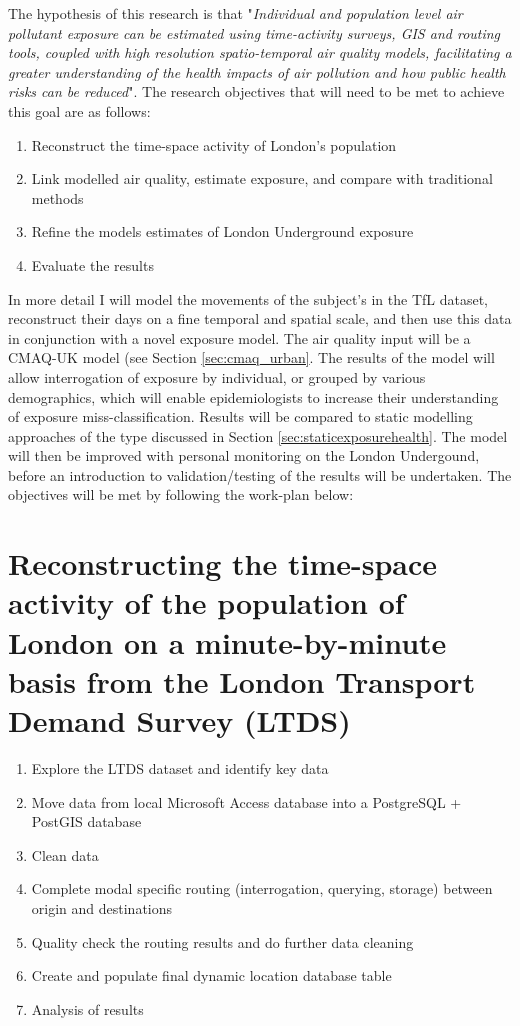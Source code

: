 The hypothesis of this research is that "\textit{Individual and population level air pollutant exposure can be estimated using time-activity surveys, GIS and routing tools, coupled with high resolution spatio-temporal air quality models, facilitating a greater understanding of the health impacts of air pollution and how public health risks can be reduced}". The research objectives that will need to be met to achieve this goal are as follows:

\begin{enumerate}
\item Reconstruct the time-space activity of London's population
\item Link modelled air quality, estimate exposure, and compare with traditional methods
\item Refine the models estimates of London Underground exposure
\item Evaluate the results
\end{enumerate}

In more detail I will model the movements of the subject's in the TfL dataset, reconstruct their days on a fine temporal and spatial scale, and then use this data in conjunction with a novel exposure model. The air quality input will be a CMAQ-UK model (see Section \ref{sec:cmaq_urban}. The results of the model will allow interrogation of exposure by individual, or grouped by various demographics, which will enable epidemiologists to increase their understanding of exposure miss-classification. Results will be compared to static modelling approaches of the type discussed in Section \ref{sec:staticexposurehealth}. The model will then be improved with personal monitoring on the London Undergound, before an introduction to validation/testing of the results will be undertaken. The objectives will be met by following the work-plan below:

\section{Reconstructing the  time-space activity of the population of London on a minute-by-minute basis from the London Transport Demand Survey (LTDS)}

\begin{enumerate}
\item Explore the LTDS dataset and identify key data
\item Move data from local Microsoft Access database into a PostgreSQL + PostGIS database
\item Clean data
\item Complete modal specific routing (interrogation, querying, storage) between origin and destinations
\item Quality check the routing results and do further data cleaning
\item Create and populate final dynamic location database table
\item Analysis of results
\end{enumerate}

